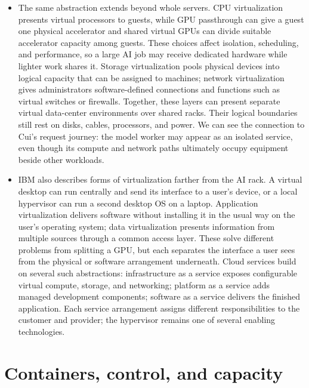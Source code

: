 \documentclass[10pt]{article}
\begin{document}
\begin{itemize}[leftmargin=1.25em, itemsep=0.3em, parsep=0pt, topsep=0pt]
    \item The same abstraction extends beyond whole servers. CPU virtualization presents virtual processors to guests, while GPU passthrough can give a guest one physical accelerator and shared virtual GPUs can divide suitable accelerator capacity among guests. These choices affect isolation, scheduling, and performance, so a large AI job may receive dedicated hardware while lighter work shares it. Storage virtualization pools physical devices into logical capacity that can be assigned to machines; network virtualization gives administrators software-defined connections and functions such as virtual switches or firewalls. Together, these layers can present separate virtual data-center environments over shared racks. Their logical boundaries still rest on disks, cables, processors, and power. We can see the connection to Cui's request journey: the model worker may appear as an isolated service, even though its compute and network paths ultimately occupy equipment beside other workloads.

    \item IBM also describes forms of virtualization farther from the AI rack. A virtual desktop can run centrally and send its interface to a user's device, or a local hypervisor can run a second desktop OS on a laptop. Application virtualization delivers software without installing it in the usual way on the user's operating system; data virtualization presents information from multiple sources through a common access layer. These solve different problems from splitting a GPU, but each separates the interface a user sees from the physical or software arrangement underneath. Cloud services build on several such abstractions: infrastructure as a service exposes configurable virtual compute, storage, and networking; platform as a service adds managed development components; software as a service delivers the finished application. Each service arrangement assigns different responsibilities to the customer and provider; the hypervisor remains one of several enabling technologies.
\end{itemize}

\newpage
\section*{Containers, control, and capacity}
\end{document}
